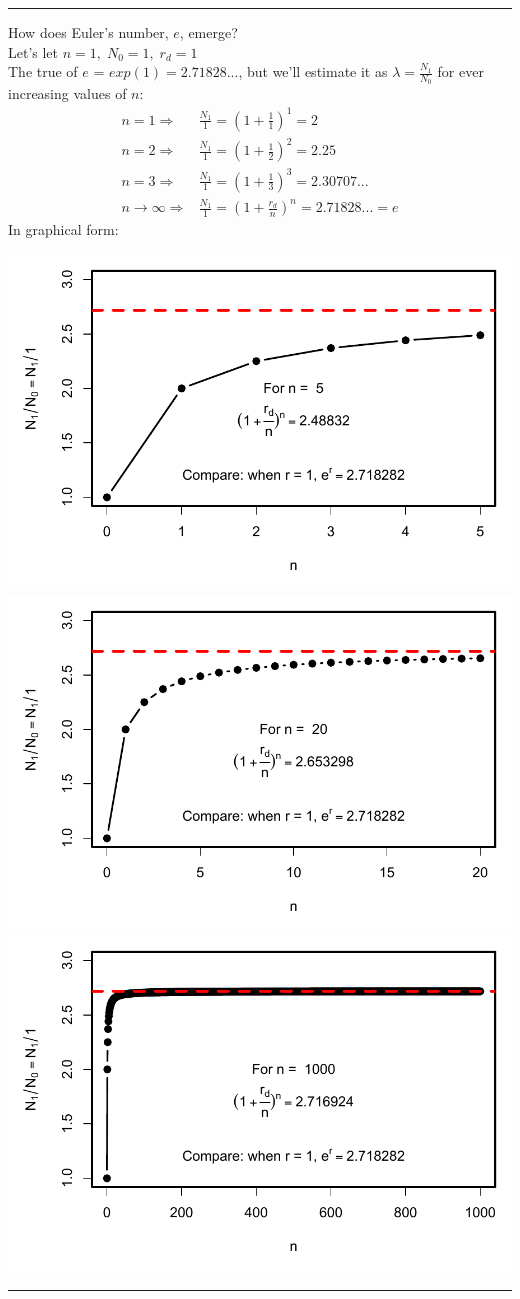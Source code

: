 \documentclass{article}
\begin{document}
\rule[0.5ex]{\linewidth}{1pt}
How does Euler's number, $e$, emerge?\\
Let's let $n=1, \; N_0=1, \; r_d=1$\\
The true of $e$ = $exp(1) = 2.71828...$, but we'll estimate it as $\lambda = \tfrac{N_1}{N_0}$ for ever increasing values of $n$:
\begin{align*}
	n=1 \Rightarrow & \frac{N_1}{1}= \left(1+\tfrac{1}{1}\right)^1= 2 \\
	n=2 \Rightarrow & \frac{N_1}{1}= \left(1+\tfrac{1}{2}\right)^2= 2.25 \\
	n=3 \Rightarrow & \frac{N_1}{1}= \left(1+\tfrac{1}{3}\right)^3= 2.30707... \\
	n \to\infty \Rightarrow & \frac{N_1}{1} = \left(1+\tfrac{r_d}{n}\right)^n =  2.71828... = e
\end{align*}
In graphical form:
\begin{center}
\includegraphics[width=0.45\linewidth]{figs/Rplot1}
\includegraphics[width=0.45\linewidth]{figs/Rplot2}
\includegraphics[width=0.6\linewidth]{figs/Rplot3}
\end{center}

\rule[0.5ex]{\linewidth}{1pt}
\end{document}

